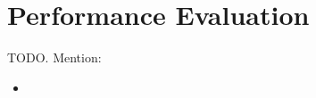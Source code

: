 \section{Performance Evaluation} %
\label{sec:performance_evaluation}
TODO. Mention:
\begin{itemize}
	\item 
\end{itemize}
